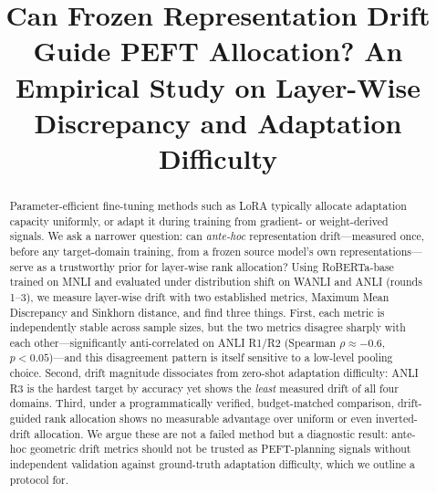 \documentclass[conference]{IEEEtran}
\begin{document}
\title{Can Frozen Representation Drift Guide PEFT Allocation? An Empirical Study on Layer-Wise Discrepancy and Adaptation Difficulty}

\author{
\and
{}
}

\maketitle

\begin{abstract}
Parameter-efficient fine-tuning methods such as LoRA typically allocate adaptation capacity uniformly, or adapt it during training from gradient- or weight-derived signals. We ask a narrower question: can \emph{ante-hoc} representation drift---measured once, before any target-domain training, from a frozen source model's own representations---serve as a trustworthy prior for layer-wise rank allocation? Using RoBERTa-base trained on MNLI and evaluated under distribution shift on WANLI and ANLI (rounds 1--3), we measure layer-wise drift with two established metrics, Maximum Mean Discrepancy and Sinkhorn distance, and find three things. First, each metric is independently stable across sample sizes, but the two metrics disagree sharply with each other---significantly anti-correlated on ANLI R1/R2 (Spearman $\rho\approx-0.6$, $p<0.05$)---and this disagreement pattern is itself sensitive to a low-level pooling choice. Second, drift magnitude dissociates from zero-shot adaptation difficulty: ANLI R3 is the hardest target by accuracy yet shows the \emph{least} measured drift of all four domains. Third, under a programmatically verified, budget-matched comparison, drift-guided rank allocation shows no measurable advantage over uniform or even inverted-drift allocation. We argue these are not a failed method but a diagnostic result: ante-hoc geometric drift metrics should not be trusted as PEFT-planning signals without independent validation against ground-truth adaptation difficulty, which we outline a protocol for.
\end{abstract}
\end{document}
